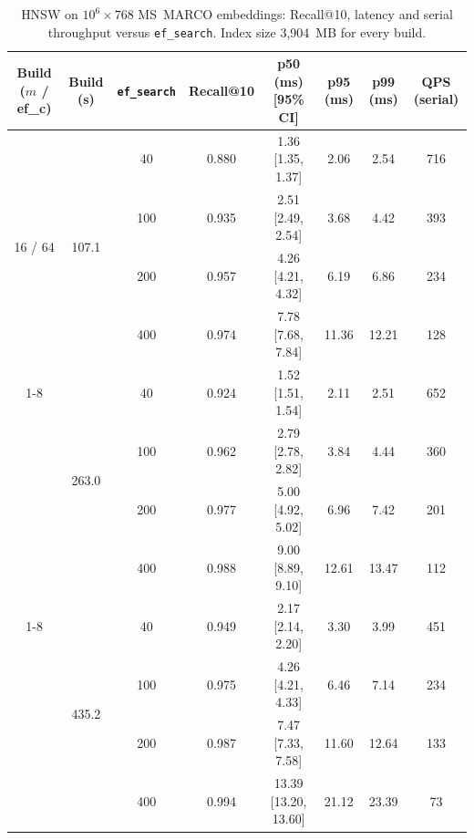 \documentclass[conference]{IEEEtran}
\newcommand{\code}[1]{\texttt{#1}}
\begin{document}
\begin{table}[t]
\caption{HNSW on $10^6 \times 768$ MS~MARCO embeddings: Recall@10, latency and serial throughput
versus \code{ef\_search}. Index size 3{,}904~MB for every build.}
\label{tab:hnsw}
\centering
\begin{tabular}{@{}c c c c c c c c@{}}
\toprule
Build ($m$ / ef\_c) & Build (s) & \code{ef\_search} & Recall@10 & p50 (ms) [95\% CI] & p95 (ms) & p99 (ms) & QPS (serial) \\
\midrule
\multirow{4}{*}{16 / 64} & \multirow{4}{*}{107.1} & 40  & 0.880 & 1.36 [1.35, 1.37] & 2.06  & 2.54  & 716 \\
                         &                        & 100 & 0.935 & 2.51 [2.49, 2.54] & 3.68  & 4.42  & 393 \\
                         &                        & 200 & 0.957 & 4.26 [4.21, 4.32] & 6.19  & 6.86  & 234 \\
                         &                        & 400 & 0.974 & 7.78 [7.68, 7.84] & 11.36 & 12.21 & 128 \\
\cmidrule(lr){1-8}
\multirow{4}{*}{16 / 200} & \multirow{4}{*}{263.0} & 40  & 0.924 & 1.52 [1.51, 1.54] & 2.11  & 2.51  & 652 \\
                          &                        & 100 & 0.962 & 2.79 [2.78, 2.82] & 3.84  & 4.44  & 360 \\
                          &                        & 200 & 0.977 & 5.00 [4.92, 5.02] & 6.96  & 7.42  & 201 \\
                          &                        & 400 & 0.988 & 9.00 [8.89, 9.10] & 12.61 & 13.47 & 112 \\
\cmidrule(lr){1-8}
\multirow{4}{*}{32 / 200} & \multirow{4}{*}{435.2} & 40  & 0.949 & 2.17 [2.14, 2.20]    & 3.30  & 3.99  & 451 \\
                          &                        & 100 & 0.975 & 4.26 [4.21, 4.33]    & 6.46  & 7.14  & 234 \\
                          &                        & 200 & 0.987 & 7.47 [7.33, 7.58]    & 11.60 & 12.64 & 133 \\
                          &                        & 400 & 0.994 & 13.39 [13.20, 13.60] & 21.12 & 23.39 & 73 \\
\bottomrule
\end{tabular}
\end{table}
\end{document}
